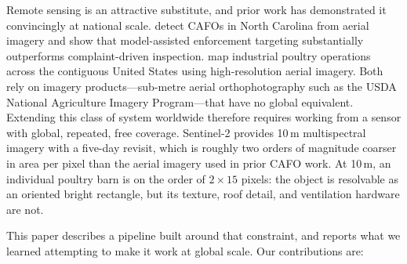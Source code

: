 \documentclass[11pt,a4paper]{article}
\begin{document}
Remote sensing is an attractive substitute, and prior work has demonstrated it
convincingly at national scale. \citet{handannader2019cafo} detect CAFOs in
North Carolina from aerial imagery and show that model-assisted enforcement
targeting substantially outperforms complaint-driven inspection.
\citet{robinson2022poultry} map industrial poultry operations across the
contiguous United States using high-resolution aerial imagery. Both rely on
imagery products---sub-metre aerial orthophotography such as the USDA National
Agriculture Imagery Program---that have no global equivalent. Extending this
class of system worldwide therefore requires working from a sensor with global,
repeated, free coverage. Sentinel-2 \citep{drusch2012sentinel2} provides
10\,m multispectral imagery with a five-day revisit, which is roughly two
orders of magnitude coarser in area per pixel than the aerial imagery used in
prior CAFO work. At 10\,m, an individual poultry barn is on the order of
$2 \times 15$ pixels: the object is resolvable as an oriented bright
rectangle, but its texture, roof detail, and ventilation hardware are not.

This paper describes a pipeline built around that constraint, and reports what
we learned attempting to make it work at global scale. Our contributions are:
\end{document}
